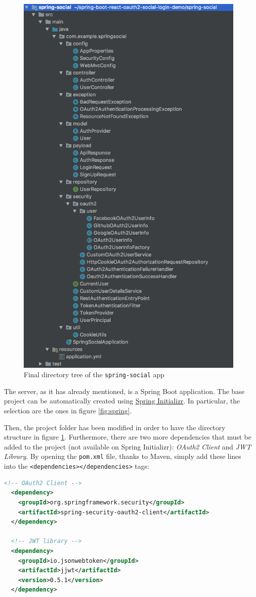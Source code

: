 \begin{figure}
  \begin{center}
    \includegraphics[width=0.3 \textwidth]{chapters/images/chp6/springdir.jpg}
  \end{center}
  \caption{Final directory tree of the \texttt{spring-social} app}
  \label{fig:dirsocial}
\end{figure}

The server, as it has already mentioned, is a Spring Boot application. The base project can be automatically created using \href{https://start.spring.io/}{Spring Initializr}. In particular, the selection are the ones in figure \ref{fig:spring}.

Then, the project folder has been modified in order to have the directory structure in figure \ref{fig:dirsocial}. Furthermore, there are two more dependencies that must be added to the project (not available on Spring Initializr): \textit{OAuth2 Client} and \textit{JWT Library}. By opening the \texttt{pom.xml} file, thanks to Maven, simply add these lines into the \texttt{<dependencies></dependencies>} tags:



\begin{lstlisting}[language=XML, basicstyle=\fontsize{9}{11}\ttfamily]
  <!-- OAuth2 Client -->
  <dependency>
    <groupId>org.springframework.security</groupId>
    <artifactId>spring-security-oauth2-client</artifactId>
  </dependency>

  <!-- JWT library -->
  <dependency>
    <groupId>io.jsonwebtoken</groupId>
    <artifactId>jjwt</artifactId>
    <version>0.5.1</version>
  </dependency>
\end{lstlisting}

